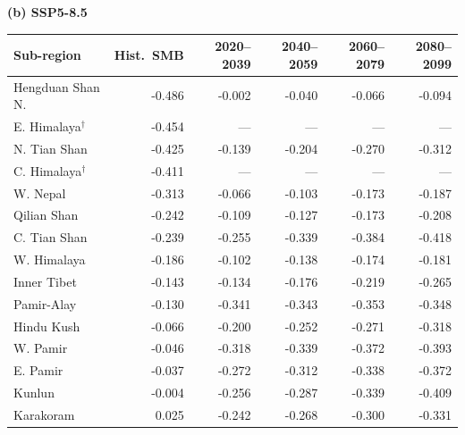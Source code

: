 \begin{table}[htbp]
\vspace{4pt}

\textbf{(b) SSP5-8.5}\\[2pt]
\begin{tabular}{lrrrrr}
\hline
Sub-region & Hist.\ SMB & 2020--2039 & 2040--2059 & 2060--2079 & 2080--2099 \\
\hline
Hengduan Shan N. & -0.486 & -0.002 & -0.040 & -0.066 & -0.094 \\
E. Himalaya$^{\dagger}$ & -0.454 & --- & --- & --- & --- \\
N. Tian Shan & -0.425 & -0.139 & -0.204 & -0.270 & -0.312 \\
C. Himalaya$^{\dagger}$ & -0.411 & --- & --- & --- & --- \\
W. Nepal & -0.313 & -0.066 & -0.103 & -0.173 & -0.187 \\
Qilian Shan & -0.242 & -0.109 & -0.127 & -0.173 & -0.208 \\
C. Tian Shan & -0.239 & -0.255 & -0.339 & -0.384 & -0.418 \\
W. Himalaya & -0.186 & -0.102 & -0.138 & -0.174 & -0.181 \\
Inner Tibet & -0.143 & -0.134 & -0.176 & -0.219 & -0.265 \\
Pamir-Alay & -0.130 & -0.341 & -0.343 & -0.353 & -0.348 \\
Hindu Kush & -0.066 & -0.200 & -0.252 & -0.271 & -0.318 \\
W. Pamir & -0.046 & -0.318 & -0.339 & -0.372 & -0.393 \\
E. Pamir & -0.037 & -0.272 & -0.312 & -0.338 & -0.372 \\
Kunlun & -0.004 & -0.256 & -0.287 & -0.339 & -0.409 \\
Karakoram & 0.025 & -0.242 & -0.268 & -0.300 & -0.331 \\
\hline
\end{tabular}
\end{table}